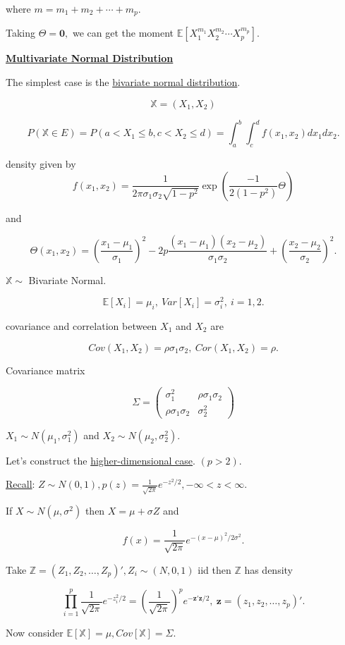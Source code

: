 \documentclass[twoside]{article}
\begin{document}
where $m=m_1+m_2+\cdots+m_p$.

Taking $\Theta=\mathbf{0},$ we can get the moment $\mathbb{E}[X_1^{m_1}X_2^{m_2}\cdots X_p^{m_p}]$.

\underline{\textbf{Multivariate Normal Distribution}}

The simplest case is the \underline{bivariate normal distribution}.

$$\mathbb{X}=(X_1,X_2)$$

$$P(\mathbb{X}\in E)=P(a<X_1\leq b, c<X_2\leq d)=\int^b_a\int^d_c f(x_1,x_2)dx_1dx_2.$$

density given by $$f(x_1,x_2)=\frac{1}{2\pi\sigma_1\sigma_2\sqrt{1-p^2}}\exp\left(\frac{-1}{2(1-p^2)}\Theta\right)$$

and

$$\Theta(x_1,x_2)=\left(\frac{x_1-\mu_1}{\sigma_1}\right)^2-2p\frac{(x_1-\mu_1)(x_2-\mu_2)}{\sigma_1\sigma_2}+\left(\frac{x_2-\mu_2}{\sigma_2}\right)^2.$$

$\mathbb{X}\sim $ Bivariate Normal.

$$\mathbb{E}[X_i]=\mu_i,\ Var[X_i]=\sigma_i^2,\ i=1, 2.$$

covariance and correlation between $X_1$ and $X_2$ are

$$Cov(X_1,X_2)=\rho\sigma_1\sigma_2,\ Cor(X_1,X_2)=\rho.$$

Covariance matrix

$$\Sigma=\begin{pmatrix}
	\sigma^2_1 & \rho\sigma_1\sigma_2\\
	\rho\sigma_1\sigma_2 & \sigma_2^2
\end{pmatrix}$$

$X_1\sim N(\mu_1, \sigma_1^2)$ and $X_2\sim N(\mu_2, \sigma_2^2)$.

Let's construct the \underline{higher-dimensional case}. $(p>2)$.

\underline{Recall}: $Z\sim N(0,1), p(z)=\frac{1}{\sqrt{2\pi}}e^{-z^2/2}, -\infty<z<\infty.$

If $X\sim N(\mu,\sigma^2)$ then $X=\mu+\sigma Z$ and 

$$f(x)=\frac{1}{\sqrt{2\pi}}e^{-(x-\mu)^2/2\sigma^2}.$$

Take $\mathbb{Z}=(Z_1,Z_2,\dots,Z_p)', Z_i\sim(N,0,1)$ iid then $\mathbb{Z}$ has density

$$\prod^p_{i=1}\frac{1}{\sqrt{2\pi}}e^{-z_i^2/2}=\left(\frac{1}{\sqrt{2\pi}}\right)^p e^{-\mathbf{z}'\mathbf{z}/2},\ \mathbf{z}=(z_1,z_2,\dots,z_p)'.$$

Now consider $\mathbb{E}[\mathbb{X}]=\mu, Cov[\mathbb{X}]=\Sigma.$
\end{document}
